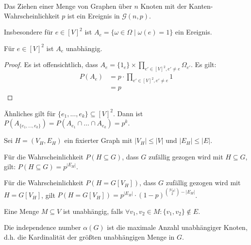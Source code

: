 \begin{remark}
    Das Ziehen einer Menge von Graphen über $ n $ Knoten mit der Kanten-Wahrscheinlichkeit $ p $ ist ein Ereignis in $ \mathcal{G}(n, p) $.

    Insbesondere für $ e \in [V]^2 $ ist $ A_e = \{ \omega \in \Omega \mid \omega(e) = 1 \} $ ein Ereignis.
\end{remark}

\begin{proposition}
    Für $ e \in [V]^2 $ ist $ A_e $ unabhängig.
\end{proposition}

\begin{proof}
    Es ist offensichtlich, dass $ A_e = \{ 1_e \} \times \prod_{e' \in [V]^2, e' \ne e} \Omega_{e'} $.
    Es gilt:
    \begin{align*}
        P(A_e) &= p \cdot \prod_{e' \in [V]^2, e' \ne e} 1 \\
        &= p
    \end{align*}
\end{proof}

\begin{remark}
    Ähnliches gilt für $ \{ e_1, \dots, e_k \} \subseteq [V]^2 $.
    Dann ist $ P(A_{\{ e_1, \dots, e_k \}}) = P(A_{e_1} \cap \dots \cap A_{e_k}) = p^k $.
\end{remark}

\begin{proposition}
    Sei $ H = (V_H, E_H)$ ein fixierter Graph mit $ |V_H| \leq |V| $ und $ |E_H| \leq |E| $.

    Für die Wahrscheinlichkeit $ P(H \subseteq G) $, dass $ G $ zufällig gezogen wird mit $ H \subseteq G $, gilt: $ P(H \subseteq G) = p^{|E_H|} $.

    Für die Wahrscheinlichkeit $ P(H = G[V_H]) $, dass $ G $ zufällig gezogen wird mit $ H = G[V_H] $, gilt $ P(H = G[V_H]) = p^{|E_H|} \cdot (1 - p)^{\binom{|V_H|}{2} - |E_H|} $.
\end{proposition}

\begin{definition}
    Eine Menge $ M \subseteq V $ ist unabhängig, falls $ \forall v_1, v_2 \in M: \{ v_1, v_2 \} \notin E $.
\end{definition}

\begin{definition}
    Die independence number $ \alpha(G) $ ist die maximale Anzahl unabhängiger Knoten, d.h. die Kardinalität der größten unabhängigen Menge in $ G $.
\end{definition}

